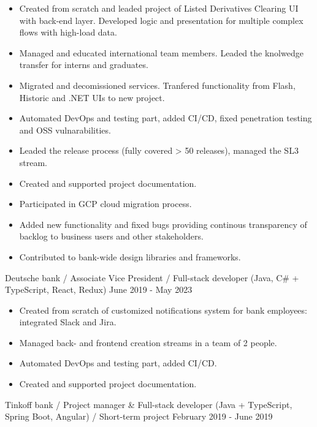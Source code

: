 \begin{cventries}
\vspace{-0.4cm}	
\cventry
{
\vspace{-0.4cm}
\begin{itemize}
\item Created from scratch and leaded project of Listed Derivatives Clearing UI with back-end layer. Developed logic and presentation for multiple complex flows with high-load data.
\item Managed and educated international team members. Leaded the knolwedge transfer for interns and graduates.
\item Migrated and decomissioned services. Tranfered functionality from Flash, Historic and .NET UIs to new project. 
\item Automated DevOps and testing part, added CI/CD, fixed penetration testing and OSS vulnarabilities. 
\item Leaded the release process (fully covered > 50 releases), managed the SL3 stream.
\item Created and supported project documentation.
\item Participated in GCP cloud migration process.
\item Added new functionality and fixed bugs providing continous transparency of backlog to business users and other stakeholders.
\item Contributed to bank-wide design libraries and frameworks.
\end{itemize}
} %
{Deutsche bank / Associate Vice President / Full-stack developer (Java, C\# + TypeScript, React, Redux)} %
{} %
{June 2019 - May 2023} %
\noindent	

\vspace{-0.4cm}
\cventry
{
\vspace{-0.4cm}
\begin{itemize}
\item Created from scratch of customized notifications system for bank employees: integrated Slack and Jira.
\item Managed back- and frontend creation streams in a team of 2 people.
\item Automated DevOps and testing part, added CI/CD. 
\item Created and supported project documentation.
\end{itemize}
} %
{Tinkoff bank / Project manager \& Full-stack developer (Java + TypeScript, Spring Boot, Angular) / Short-term project} %
{} %
{February 2019 - June 2019} %
\noindent	


\end{cventries}
